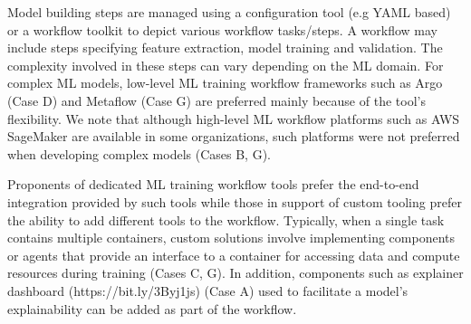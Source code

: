 Model building steps are managed using a configuration tool (e.g YAML based) or a workflow toolkit to depict various workflow tasks/steps. A workflow may include steps specifying feature extraction, model training and validation. The complexity involved in these steps can vary depending on the ML domain. For complex ML models, low-level ML training workflow frameworks such as Argo (Case D) and Metaflow (Case G) are preferred mainly because of the tool's flexibility. We note that although high-level ML workflow platforms such as AWS SageMaker are available in some organizations, such platforms were not preferred when developing complex models (Cases B, G).


Proponents of dedicated ML training workflow tools prefer the end-to-end integration provided by such tools while those in support of custom tooling prefer the ability to add different tools to the workflow. Typically, when a single task contains multiple containers, custom solutions involve implementing components or agents that provide an interface to a container for accessing data and compute resources during training (Cases C, G). In addition, components such as explainer dashboard (https://bit.ly/3Byj1js) (Case A) used to facilitate a model's explainability can be added as part of the workflow.



